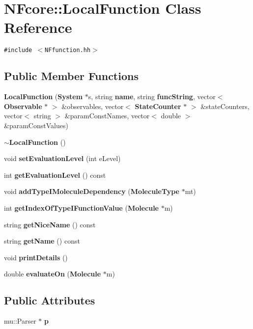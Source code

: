 \section{NFcore::LocalFunction Class Reference}
\label{classNFcore_1_1LocalFunction}
{\tt \#include $<$NFfunction.hh$>$}

\subsection*{Public Member Functions}
\begin{CompactItemize}
\item 
{\bf LocalFunction} ({\bf System} $\ast$s, string {\bf name}, string {\bf funcString}, vector$<$ {\bf Observable} $\ast$ $>$ \&observables, vector$<$ {\bf StateCounter} $\ast$ $>$ \&stateCounters, vector$<$ string $>$ \&paramConstNames, vector$<$ double $>$ \&paramConstValues)
\item 
{\bf $\sim$LocalFunction} ()
\item 
void {\bf setEvaluationLevel} (int eLevel)
\item 
int {\bf getEvaluationLevel} () const 
\item 
void {\bf addTypeIMoleculeDependency} ({\bf MoleculeType} $\ast$mt)
\item 
int {\bf getIndexOfTypeIFunctionValue} ({\bf Molecule} $\ast$m)
\item 
string {\bf getNiceName} () const 
\item 
string {\bf getName} () const 
\item 
void {\bf printDetails} ()
\item 
double {\bf evaluateOn} ({\bf Molecule} $\ast$m)
\end{CompactItemize}
\subsection*{Public Attributes}
\begin{CompactItemize}
\item 
mu::Parser $\ast$ {\bf p}
\end{CompactItemize}
